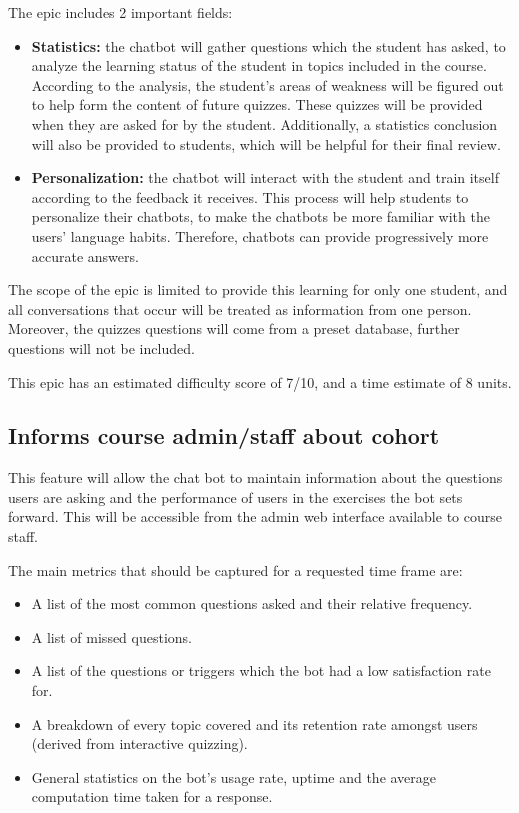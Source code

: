 \documentclass{article}
\begin{document}
The epic includes 2 important fields:
\begin{itemize}
  \item \textbf{Statistics:} the chatbot will gather questions which the student has asked, to analyze the learning status of the student in topics included in the course. According to the analysis, the student's areas of weakness will be figured out to help form the content of future quizzes. These quizzes will be provided when they are asked for by the student. Additionally, a statistics conclusion will also be provided to students, which will be helpful for their final review.
  \item \textbf{Personalization:} the chatbot will interact with the student and train itself according to the feedback it receives. This process will help students to personalize their chatbots, to make the chatbots be more familiar with the users’ language habits. Therefore, chatbots can provide progressively more accurate answers. 
\end{itemize}

The scope of the epic is limited to provide this learning for only one student, and all conversations that occur will be treated as information from one person. Moreover, the quizzes questions will come from a preset database, further questions will not be included.

This epic has an estimated difficulty score of 7/10, and a time estimate of 8 units.


\subsection{Informs course admin/staff about cohort}

This feature will allow the chat bot to maintain information about the questions users are asking and the performance of users in the exercises the bot sets forward. This will be accessible from the admin web interface available to course staff.

The main metrics that should be captured for a requested time frame are:
\begin{itemize}
  \item A list of the most common questions asked and their relative frequency.
  \item A list of missed questions.
  \item A list of the questions or triggers which the bot had a low satisfaction rate for.
  \item A breakdown of every topic covered and its retention rate amongst users (derived from interactive quizzing).
  \item General statistics on the bot's usage rate, uptime and the average computation time taken for a response.
\end{itemize}
\end{document}
